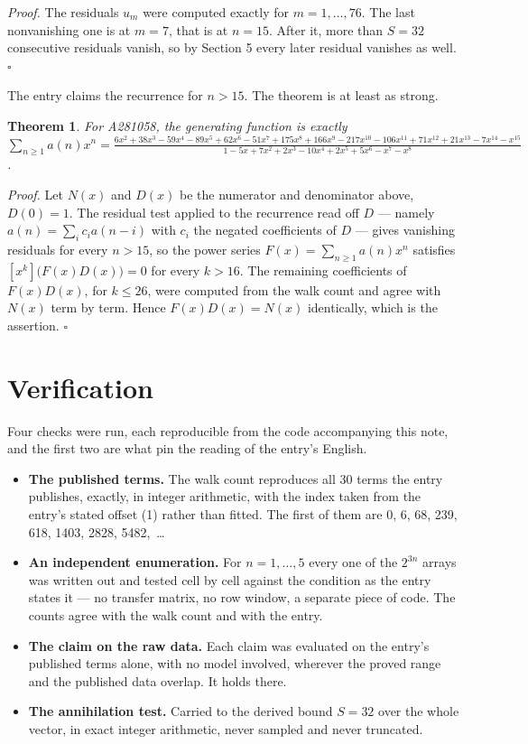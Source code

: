 \documentclass[11pt]{article}
\newtheorem{theorem}{Theorem}
\theoremstyle{definition}
\begin{document}
{\itshape Proof.} The residuals $u_m$ were computed exactly for $m = 1,\dots,76$. The last nonvanishing one is at $m = 7$, that is at $n = 15$. After it, more than $S = 32$ consecutive residuals vanish, so by Section 5 every later residual vanishes as well. $\square$

The entry claims the recurrence for $n > 15$. The theorem is at least as strong.

\begin{theorem} For A281058, the generating function is exactly $\sum_{n\ge 1} a(n)x^n = \frac{6x^{2} + 38x^{3} - 59x^{4} - 89x^{5} + 62x^{6} - 51x^{7} + 175x^{8} + 166x^{9} - 217x^{10} - 106x^{11} + 71x^{12} + 21x^{13} - 7x^{14} - x^{15}}{1 - 5x + 7x^{2} + 2x^{3} - 10x^{4} + 2x^{5} + 5x^{6} - x^{7} - x^{8}}$.\end{theorem}

{\itshape Proof.} Let $N(x)$ and $D(x)$ be the numerator and denominator above, $D(0)=1$. The residual test applied to the recurrence read off $D$ --- namely $a(n) = \sum_i c_i a(n-i)$ with $c_i$ the negated coefficients of $D$ --- gives vanishing residuals for every $n > 15$, so the power series $F(x)=\sum_{n\ge 1}a(n)x^n$ satisfies $[x^k]\bigl(F(x)D(x)\bigr) = 0$ for every $k > 16$. The remaining coefficients of $F(x)D(x)$, for $k \le 26$, were computed from the walk count and agree with $N(x)$ term by term. Hence $F(x)D(x) = N(x)$ identically, which is the assertion. $\square$

\section{Verification}

Four checks were run, each reproducible from the code accompanying this note, and the first two are what pin the reading of the entry's English.

\begin{itemize}

\item {\bfseries The published terms.} The walk count reproduces all 30 terms the entry publishes, exactly, in integer arithmetic, with the index taken from the entry's stated offset (1) rather than fitted. The first of them are 0, 6, 68, 239, 618, 1403, 2828, 5482,~\dots

\item {\bfseries An independent enumeration.} For $n = 1,\dots,5$ every one of the $2^{3n}$ arrays was written out and tested cell by cell against the condition as the entry states it --- no transfer matrix, no row window, a separate piece of code. The counts agree with the walk count and with the entry.

\item {\bfseries The claim on the raw data.} Each claim was evaluated on the entry's published terms alone, with no model involved, wherever the proved range and the published data overlap. It holds there.

\item {\bfseries The annihilation test.} Carried to the derived bound $S = 32$ over the whole vector, in exact integer arithmetic, never sampled and never truncated.

\end{itemize}
\end{document}
